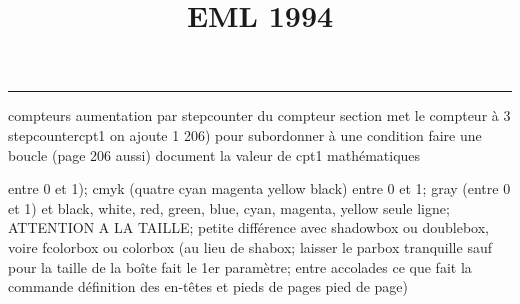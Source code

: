 \documentclass[11pt]{article}%
\title{\bf \vspace{-2cm} EML 1994} %
\author{} %
\date{} %
\renewcommand{\headrulewidth}{0pt}%
\renewcommand{\footrulewidth}{0.4pt}%
\begin{document}
\maketitle %
\vspace{-1.4cm}\hrule %
\thispagestyle{fancy}

\vspace*{.2cm}



compteurs%
aumentation par stepcounter du compteur section%
met le compteur à 3%
stepcounter{cpt1} on ajoute 1%
206) pour subordonner à une condition %
faire une boucle (page 206 aussi) %
document la valeur de cpt1 
mathématiques\newcommand{\ch}{\operatorname{ch}} 
\newcommand{\sh}{\operatorname{sh}}
\renewcommand{\tanh}{\operatorname{th}}
\renewcommand{\sinh}{\operatorname{sh}}
\renewcommand{\cosh}{\operatorname{ch}}
\newcommand{\argsh}{\operatorname{argsh}}
\newcommand{\argch}{\operatorname{argch}}
\newcommand{\argth}{\operatorname{argth}}
\newcommand{\ker}{\operatorname{Ker}}
\renewcommand{\im}{\operatorname{Im}}
\newcommand{\rg}{\operatorname{rg}}
\newcommand{\Id}{\operatorname{Id}}
\newcommand{\id}{\operatorname{id}}
\renewcommand{\leq}{\leq}
\renewcommand{\geq}{\geq }

entre 0 et 1); cmyk (quatre cyan magenta yellow black) entre 0 et 1;
gray (entre 0 et 1) et black, white, red, green, blue, cyan, magenta,
yellow%
seule ligne; ATTENTION A LA TAILLE; petite différence avec shadowbox ou
doublebox, voire fcolorbox ou colorbox (au lieu de shabox; laisser le
parbox tranquille sauf pour la taille de la boîte
\newcommand{\Tbox}[1]{\begin{center} \shabox{\parbox{0.6
\linewidth}{#1}} \end{center}} %
fait le 1er paramètre; entre accolades ce que fait la commande
définition des en-têtes et pieds de pages\pagestyle{fancy}
\chead{}
\rfoot[ \ \thepage]{\thepage}
\cfoot{}
\lfoot{}
\thispagestyle{fancy} %
pied de page)\renewcommand{\footrulewidth}{0.4pt}
\renewcommand{\headrulewidth}{0.4pt}
\end{document}
